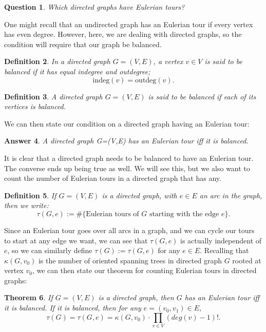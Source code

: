 \documentclass[11pt]{article}
\newtheorem{theorem}{Theorem}
\newtheorem{definition}[theorem]{Definition}
\newtheorem{question}[theorem]{Question}
\newtheorem{answer2}[theorem]{Answer}
\newcommand{\keyword}[1]{{\emph{#1}}}
\begin{document}
\pagebreak

\begin{question}
	Which directed graphs have Eulerian tours?
\end{question}

One might recall that an undirected graph has an Eulerian tour if every vertex has even degree. However, here, we are dealing with directed graphs, so the condition will require that our graph be balanced.

\begin{definition}
	In a directed graph $G=(V,E)$, a vertex $v \in V$ is said to be \keyword{balanced} if it has equal indegree and outdegree;
	$$\text{indeg}(v)=\text{outdeg}(v).$$
\end{definition}

\begin{definition}
	A directed graph $G=(V,E)$ is said to be \keyword{balanced} if each of its vertices is balanced.
\end{definition}

We can then state our condition on a directed graph having an Eulerian tour:

\begin{answer2}
	A directed graph G=(V,E) has an Eulerian tour iff it is balanced.
\end{answer2}

It is clear that a directed graph needs to be balanced to have an Eulerian tour. The converse ends up being true as well. We will see this, but we also want to count the number of Eulerian tours in a directed graph that has any.

\begin{definition}
	If $G=(V,E)$ is a directed graph, with $e \in E$ an arc in the graph, then we write:
	$$\tau(G,e):=\#\{\text{Eulerian tours of }G \text{ starting with the edge } e\}.$$
\end{definition}

Since an Eulerian tour goes over all arcs in a graph, and we can cycle our tours to start at any edge we want, we can see that $\tau(G,e)$ is actually independent of $e$, so we can similarly define $\tau(G) := \tau(G,e)$ for any $e \in E$. Recalling that $\kappa(G,v_0)$ is the number of oriented spanning trees in directed graph $G$ rooted at vertex $v_0$, we can then state our theorem for counting Eulerian tours in directed graphs:

\begin{theorem}
	If $G=(V,E)$ is a directed graph, then $G$ has an Eulerian tour iff it is balanced. If it is balanced, then for any $e=(v_0,v_1)\in E,$
	\begin{equation} \label{theo} \tau(G) = \tau(G,e) = \kappa(G,v_0)\cdot \prod_{v \in V} (deg(v) - 1)!.\end{equation}
\end{theorem}
\end{document}
